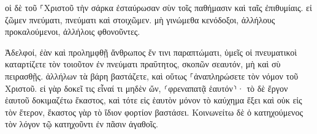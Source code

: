\documentclass{openreader}
\begin{document}
οἱ δὲ τοῦ ⸀Χριστοῦ τὴν σάρκα ἐσταύρωσαν σὺν τοῖς παθήμασιν καὶ ταῖς ἐπιθυμίαις. 
εἰ ζῶμεν πνεύματι, πνεύματι καὶ στοιχῶμεν. 
μὴ γινώμεθα κενόδοξοι, ἀλλήλους προκαλούμενοι, ἀλλήλοις φθονοῦντες. 

Ἀδελφοί, ἐὰν καὶ προλημφθῇ ἄνθρωπος ἔν τινι παραπτώματι, ὑμεῖς οἱ πνευματικοὶ καταρτίζετε τὸν τοιοῦτον ἐν πνεύματι πραΰτητος, σκοπῶν σεαυτόν, μὴ καὶ σὺ πειρασθῇς. 
ἀλλήλων τὰ βάρη βαστάζετε, καὶ οὕτως ⸀ἀναπληρώσετε τὸν νόμον τοῦ Χριστοῦ. 
εἰ γὰρ δοκεῖ τις εἶναί τι μηδὲν ὤν, ⸂φρεναπατᾷ ἑαυτόν⸃· 
τὸ δὲ ἔργον ἑαυτοῦ δοκιμαζέτω ἕκαστος, καὶ τότε εἰς ἑαυτὸν μόνον τὸ καύχημα ἕξει καὶ οὐκ εἰς τὸν ἕτερον, 
ἕκαστος γὰρ τὸ ἴδιον φορτίον βαστάσει. 
Κοινωνείτω δὲ ὁ κατηχούμενος τὸν λόγον τῷ κατηχοῦντι ἐν πᾶσιν ἀγαθοῖς. 
\end{document}
